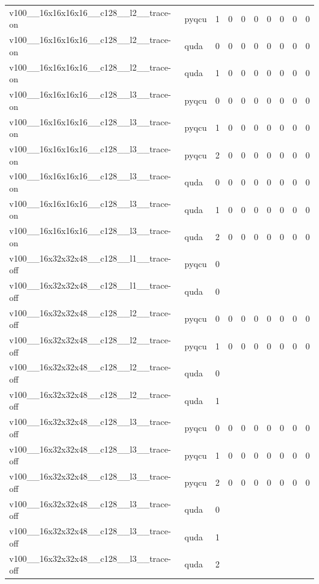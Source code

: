 \begin{table}[htbp]
\begin{tabular}{@{}llrrrrrrrr@{}}
v100\_\_16x16x16x16\_\_c128\_\_l2\_\_trace-on & pyqcu & 1 & 0 & 0 & 0 & 0 & 0 & 0 & 0 \\
v100\_\_16x16x16x16\_\_c128\_\_l2\_\_trace-on & quda & 0 & 0 & 0 & 0 & 0 & 0 & 0 & 0 \\
v100\_\_16x16x16x16\_\_c128\_\_l2\_\_trace-on & quda & 1 & 0 & 0 & 0 & 0 & 0 & 0 & 0 \\
v100\_\_16x16x16x16\_\_c128\_\_l3\_\_trace-on & pyqcu & 0 & 0 & 0 & 0 & 0 & 0 & 0 & 0 \\
v100\_\_16x16x16x16\_\_c128\_\_l3\_\_trace-on & pyqcu & 1 & 0 & 0 & 0 & 0 & 0 & 0 & 0 \\
v100\_\_16x16x16x16\_\_c128\_\_l3\_\_trace-on & pyqcu & 2 & 0 & 0 & 0 & 0 & 0 & 0 & 0 \\
v100\_\_16x16x16x16\_\_c128\_\_l3\_\_trace-on & quda & 0 & 0 & 0 & 0 & 0 & 0 & 0 & 0 \\
v100\_\_16x16x16x16\_\_c128\_\_l3\_\_trace-on & quda & 1 & 0 & 0 & 0 & 0 & 0 & 0 & 0 \\
v100\_\_16x16x16x16\_\_c128\_\_l3\_\_trace-on & quda & 2 & 0 & 0 & 0 & 0 & 0 & 0 & 0 \\
v100\_\_16x32x32x48\_\_c128\_\_l1\_\_trace-off & pyqcu & 0 &  &  &  &  &  &  &  \\
v100\_\_16x32x32x48\_\_c128\_\_l1\_\_trace-off & quda & 0 &  &  &  &  &  &  &  \\
v100\_\_16x32x32x48\_\_c128\_\_l2\_\_trace-off & pyqcu & 0 & 0 & 0 & 0 & 0 & 0 & 0 & 0 \\
v100\_\_16x32x32x48\_\_c128\_\_l2\_\_trace-off & pyqcu & 1 & 0 & 0 & 0 & 0 & 0 & 0 & 0 \\
v100\_\_16x32x32x48\_\_c128\_\_l2\_\_trace-off & quda & 0 &  &  &  &  &  &  &  \\
v100\_\_16x32x32x48\_\_c128\_\_l2\_\_trace-off & quda & 1 &  &  &  &  &  &  &  \\
v100\_\_16x32x32x48\_\_c128\_\_l3\_\_trace-off & pyqcu & 0 & 0 & 0 & 0 & 0 & 0 & 0 & 0 \\
v100\_\_16x32x32x48\_\_c128\_\_l3\_\_trace-off & pyqcu & 1 & 0 & 0 & 0 & 0 & 0 & 0 & 0 \\
v100\_\_16x32x32x48\_\_c128\_\_l3\_\_trace-off & pyqcu & 2 & 0 & 0 & 0 & 0 & 0 & 0 & 0 \\
v100\_\_16x32x32x48\_\_c128\_\_l3\_\_trace-off & quda & 0 &  &  &  &  &  &  &  \\
v100\_\_16x32x32x48\_\_c128\_\_l3\_\_trace-off & quda & 1 &  &  &  &  &  &  &  \\
v100\_\_16x32x32x48\_\_c128\_\_l3\_\_trace-off & quda & 2 &  &  &  &  &  &  &  \\

\end{tabular}
\end{table}
